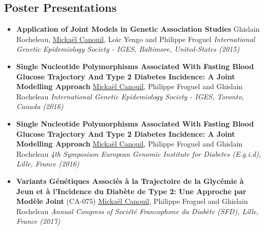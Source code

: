 \documentclass[11pt,a4paper,sans]{moderncv}
\begin{document}
\subsection{Poster Presentations}
\begin{itemize}
    \setlength{\itemsep}{0.5em}

    \item \textbf{Application of Joint Models in Genetic Association Studies}
        \newline Ghislain Rocheleau, \underline{Mickaël Canouil}, Loïc Yengo and Philippe Froguel
        \newline \textit{International Genetic Epidemiology Society - IGES, Baltimore, United-States (2015)}

    \item \textbf{Single Nucleotide Polymorphisms Associated With Fasting Blood Glucose Trajectory And Type 2 Diabetes Incidence: A Joint Modelling Approach}
        \newline \underline{Mickaël Canouil}, Philippe Froguel and Ghislain Rocheleau
        \newline \textit{International Genetic Epidemiology Society - IGES, Toronto, Canada (2016)}

    \item \textbf{Single Nucleotide Polymorphisms Associated With Fasting Blood Glucose Trajectory And Type 2 Diabetes Incidence: A Joint Modelling Approach}
        \newline \underline{Mickaël Canouil}, Philippe Froguel and Ghislain Rocheleau
        \newline \textit{4th Symposium European Genomic Institute for Diabetes (E.g.i.d), Lille, France (2016)}

    \item \textbf{Variants Génétiques Associés à la Trajectoire de la Glycémie à Jeun et à l’Incidence du Diabète de Type 2: Une Approche par Modèle Joint} (CA-075)
        \newline \underline{Mickaël Canouil}, Philippe Froguel and Ghislain Rocheleau
        \newline \textit{Annual Congress of Société Francophone du Diabète (SFD), Lille, France (2017)}

\end{itemize}


\pagebreak


\nocite{*}
\end{document}
